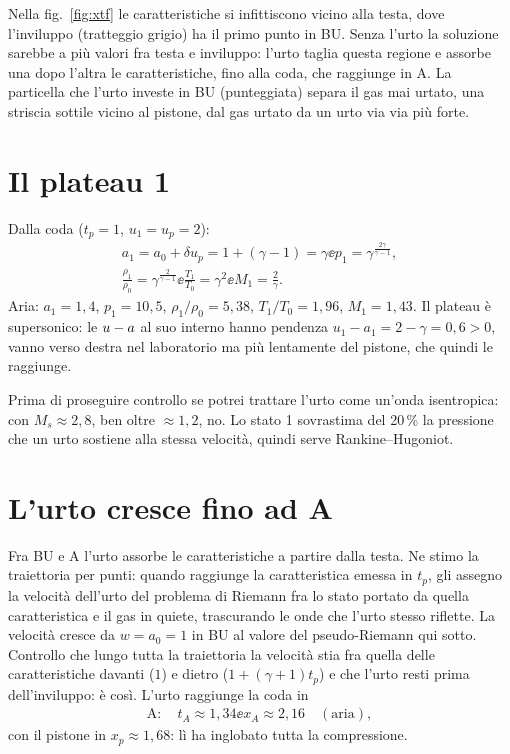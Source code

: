 Nella fig.~\ref{fig:xtf} le caratteristiche si infittiscono vicino alla testa, dove l'inviluppo (tratteggio grigio)
ha il primo punto in BU. Senza l'urto la soluzione sarebbe a più valori fra testa e inviluppo: l'urto taglia questa
regione e assorbe una dopo l'altra le caratteristiche, fino alla coda, che raggiunge in A. La particella che l'urto
investe in BU (punteggiata) separa il gas mai urtato, una striscia sottile vicino al pistone, dal gas urtato da un
urto via via più forte.

\section*{Il plateau 1}
Dalla coda ($t_p=1$, $u_1=u_p=2$):
\begin{gather*}
a_1=a_0+\delta u_p=1+(\gamma-1)=\gamma \ee p_1=\gamma^{\frac{2\gamma}{\gamma-1}},\\
\frac{\rho_1}{\rho_0}=\gamma^{\frac{2}{\gamma-1}} \ee \frac{T_1}{T_0}=\gamma^2 \ee M_1=\frac{2}{\gamma}.
\end{gather*}
Aria: $a_1=1{,}4$, $p_1=10{,}5$, $\rho_1/\rho_0=5{,}38$, $T_1/T_0=1{,}96$, $M_1=1{,}43$. Il plateau è supersonico:
le $u-a$ al suo interno hanno pendenza $u_1-a_1=2-\gamma=0{,}6>0$, vanno verso destra nel laboratorio ma più
lentamente del pistone, che quindi le raggiunge.

Prima di proseguire controllo se potrei trattare l'urto come un'onda isentropica: con $M_s\approx2{,}8$, ben oltre
$\approx1{,}2$, no. Lo stato 1 sovrastima del 20\,\% la pressione che un urto sostiene alla stessa velocità, quindi
serve Rankine--Hugoniot.

\section*{L'urto cresce fino ad A}
Fra BU e A l'urto assorbe le caratteristiche a partire dalla testa. Ne stimo la traiettoria per punti: quando
raggiunge la caratteristica emessa in $t_p$, gli assegno la velocità dell'urto del problema di Riemann fra lo stato
portato da quella caratteristica e il gas in quiete, trascurando le onde che l'urto stesso riflette. La velocità
cresce da $w=a_0=1$ in BU al valore del pseudo-Riemann qui sotto. Controllo che lungo tutta la traiettoria la velocità
stia fra quella delle caratteristiche davanti ($1$) e dietro ($1+(\gamma+1)t_p$) e che l'urto resti prima
dell'inviluppo: è così. L'urto raggiunge la coda in
\begin{gather*}
\text{A}:\quad t_A\approx1{,}34 \ee x_A\approx2{,}16\quad(\text{aria}),
\end{gather*}
con il pistone in $x_p\approx1{,}68$: lì ha inglobato tutta la compressione.


